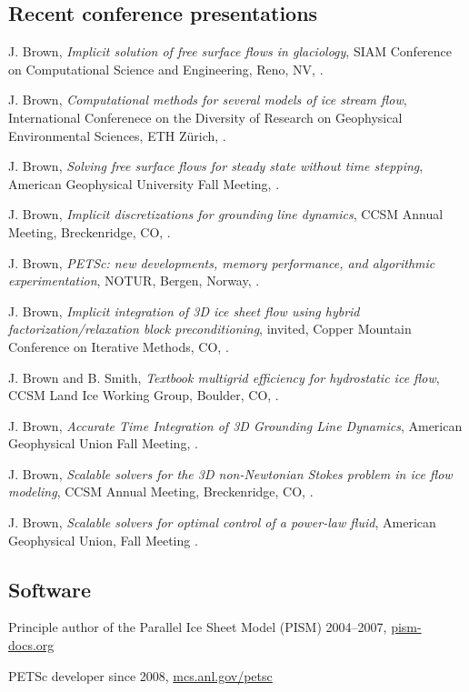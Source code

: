 \documentclass[10pt,letterpaper]{article}
\newcommand\ptitle[1]{\textit{#1}} %
\renewenvironment{itemize}{
  \begin{list}{}{
    \setlength{\leftmargin}{1.5em}
    \setlength{\itemsep}{0.25em}
    \setlength{\parskip}{0pt}
    \setlength{\parsep}{0.25em}
  }
}{
  \end{list}
}
\begin{document}
\subsection*{Recent conference presentations}
\begin{itemize}
\item J. Brown, \ptitle{Implicit solution of free surface flows in glaciology}, SIAM Conference on Computational Science and Engineering, Reno, NV, .
\item J. Brown, \ptitle{Computational methods for several models of ice stream flow}, International Conferenece on the Diversity of Research on Geophysical Environmental Sciences, ETH Z\"urich, .
\item J. Brown, \ptitle{Solving free surface flows for steady state without time stepping}, American Geophysical University Fall Meeting, .
\item J. Brown, \ptitle{Implicit discretizations for grounding line dynamics}, CCSM Annual Meeting, Breckenridge, CO,  .
\item J. Brown, \ptitle{PETSc: new developments, memory performance, and algorithmic experimentation}, NOTUR, Bergen, Norway, .
\item J. Brown, \ptitle{Implicit integration of 3D ice sheet flow using hybrid factorization/relaxation block preconditioning}, invited, Copper Mountain Conference on Iterative Methods, CO, .
\item J. Brown and B. Smith, \ptitle{Textbook multigrid efficiency for hydrostatic ice flow}, CCSM Land Ice Working Group, Boulder, CO, .
\item J. Brown, \ptitle{Accurate Time Integration of 3D Grounding Line Dynamics}, American Geophysical Union Fall Meeting, .
\item J. Brown, \ptitle{Scalable solvers for the 3D non-Newtonian Stokes problem in ice flow modeling}, CCSM Annual Meeting, Breckenridge, CO, .
\item J. Brown, \ptitle{Scalable solvers for optimal control of a power-law fluid}, American Geophysical Union, Fall Meeting .
\end{itemize}

\subsection*{Software}
\begin{itemize}
\item Principle author of the Parallel Ice Sheet Model (PISM) 2004--2007, \href{http://pism-docs.org}{\url{pism-docs.org}}
\item PETSc developer since 2008, \href{http://mcs.anl.gov/petsc}{\url{mcs.anl.gov/petsc}}
\end{itemize}
\end{document}

